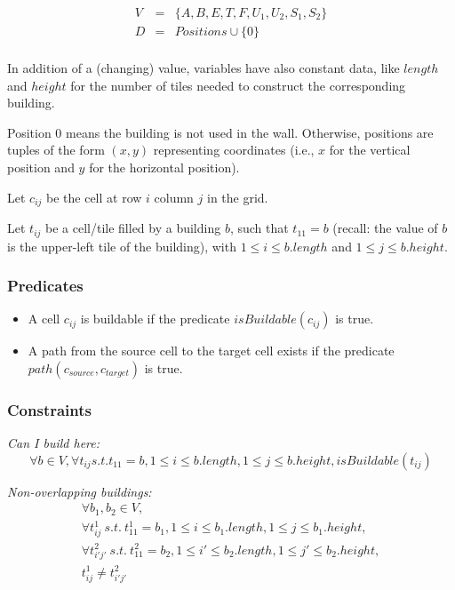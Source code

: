 \documentclass[a4paper,11pt]{article}
\begin{document}
\begin{displaymath}
  \begin{array}{ccc}
    V & = & \{A, B, E, T, F, U_1, U_2, S_1, S_2\}\\
    D & = & Positions \cup \{0\}\\
  \end{array}
\end{displaymath}

In addition of a (changing)  value, variables have also constant data,
like $length$ and $height$ for the number of tiles needed to construct
the corresponding building.

Position $0$  means the building is  not used in  the wall. Otherwise,
positions  are tuples of  the form  $(x, y)$  representing coordinates
(i.e.,  $x$ for  the  vertical  position and  $y$  for the  horizontal
position). 

Let $c_{ij}$ be the cell at row $i$ column $j$ in the grid.

Let  $t_{ij}$ be  a  cell/tile filled  by  a building  $b$, such  that
$t_{11} = b$  (recall: the value of $b$ is the  upper-left tile of the
building), with $1 \leq i \leq b.length$ and $1 \leq j \leq b.height$.


\subsubsection{Predicates}

\begin{itemize}
\item A cell $c_{ij}$ is buildable if the predicate {\bf $isBuildable(c_{ij})$} is
  true.
\item A  path from the  source cell to  the target cell exists  if the
  predicate {\bf $path(c_{source}, c_{target})$} is true.
\end{itemize}

\subsubsection{Constraints}

{\em Can I build here:}
\begin{displaymath}
  \forall  b \in V,  \forall t_{ij}  s.t. t_{11}  = b,  1 \leq  i \leq
  b.length, 1 \leq j \leq b.height, isBuildable(t_{ij})
\end{displaymath}

\noindent
{\em Non-overlapping buildings:}
\begin{displaymath}
  \begin{array}{l}
    \forall b_1, b_2 \in V,\\
    \forall t^1_{ij}\  s.t.\ t^1_{11} = b_1,  1 \leq i  \leq b_1.length, 1
    \leq j \leq b_1.height,\\
    \forall t^2_{i'j'}\ s.t.\ t^2_{11} = b_2, 1 \leq i' \leq b_2.length, 1
    \leq j' \leq b_2.height,\\
    t^1_{ij} \neq t^2_{i'j'}
  \end{array}
\end{displaymath}
\end{document}
